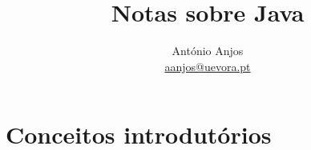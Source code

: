 \documentclass[portuguese, aspectratio=169, xcolor=table]{beamer}
\title[Java]{Notas sobre Java}
\author[António Anjos] %
{António Anjos\\\url{aanjos@uevora.pt}}
\institute[UÉ] %
{
    Departamento de Informática\\
    Universidade de Évora
}
\begin{document}
    \frame{\titlepage}
    
    


\begin{frame}{\contentsname}
    \begin{multicols}{2}
        \tableofcontents
    \end{multicols}
\end{frame}
    
    
    
    


\section{Conceitos introdutórios}
\end{document}
